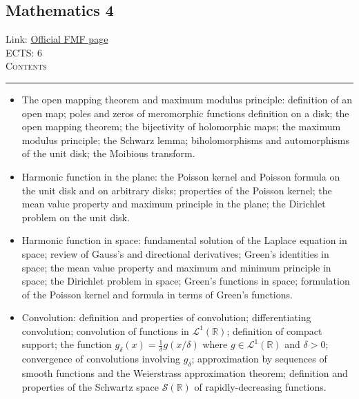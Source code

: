 \documentclass[11pt, a4paper]{article}
\newenvironment{course}[3]{
\subsection{#1}%
Link: \href{#2}{Official FMF page}\\%
ECTS: #3%
\vspace{1ex}
\\
{\large \textsc{Contents}}\\[-0.9ex]%
\rule{\textwidth}{0.5pt}
\vspace{-3ex}
}
{}
\newenvironment{chapter}[1]{
\begin{tcolorbox}[title=#1, breakable]
}
{\end{tcolorbox}}
\begin{document}
\begin{course}{Mathematics 4}{https://www.fmf.uni-lj.si/en/study-physics/programmes/1fiz/2020/7000777/courses/523/}{6}
\begin{chapter}{Complex analysis}
\begin{itemize}
            \item The open mapping theorem and maximum modulus principle: definition of an open map; poles and zeros of meromorphic functions definition on a disk; the open mapping theorem; the bijectivity of holomorphic maps; the maximum modulus principle; the Schwarz lemma; biholomorphisms and automorphisms of the unit disk; the Moibious transform.
        
        \end{itemize}
    \end{chapter}

    \begin{chapter}{Harmonic functions}
        \begin{itemize}
        
            \item Harmonic function in the plane: the Poisson kernel and Poisson formula on the unit disk and on arbitrary disks; properties of the Poisson kernel; the mean value property and maximum principle in the plane; the Dirichlet problem on the unit disk.

            \item Harmonic function in space: fundamental solution of the Laplace equation in space; review of Gauss's and directional derivatives; Green's identities in space; the mean value property and maximum and minimum principle in space; the Dirichlet problem in space; Green's functions in space; formulation of the Poisson kernel and formula in terms of Green's functions.
        
        \end{itemize}
    \end{chapter}

    \begin{chapter}{Fourier analysis}
        \begin{itemize}
        
            \item Convolution: definition and properties of convolution; differentiating convolution;
            convolution of functions in $ \mathcal{L}^{1}(\mathbb{R}) $; definition of compact support; the function $ g_{\delta}(x) = \frac{1}{\delta} g(x/\delta) $ where $ g \in \mathcal{L}^{1}(\mathbb{R}) $ and $ \delta > 0 $; convergence of convolutions involving $ g_{\delta} $;
            approximation by sequences of smooth functions and the Weierstrass approximation theorem; definition and properties of the Schwartz space $ \mathcal{S}(\mathbb{R}) $ of rapidly-decreasing functions.


\end{itemize}
\end{chapter}
\end{course}
\end{document}
